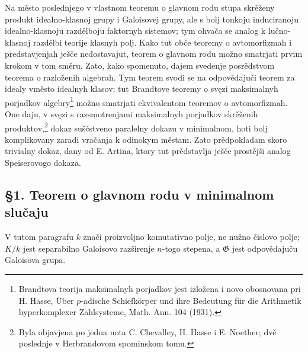 \documentclass[11pt]{article}
\newcommand{\foreign}[1]{#1}
\providecommand{\Gg}{\mathfrak G}
\begin{document}
Na město poslednjego v vlastnom teoremu o glavnom rodu stupa skrěženy produkt idealno-klasnoj grupy i Galoisovej grupy, ale s bolj tonkoju induciranoju idealno-klasnoju razdělboju faktornyh sistemov; tym ohvača se analog k lučno-klasnoj razdělbi teorije klasnyh polj. Kako tut obče teoremy o avtomorfizmah i predstavjenjah ješče nedostavajut, teorem o glavnom rodu možno smatrjati prvim krokom v tom směru. Zato, kako spomenuto, dajem svedenje posrědstvom teorema o razloženih algebrah. Tym teorem svodi se na odpovědajuči teorem za idealy vměsto idealnyh klasov; tut Brandtove teoremy o svęzi maksimalnyh porjadkov algebry\footnote{Brandtova teorija maksimalnyh porjadkov jest izložena i novo obosnovana pri H. Hasse, \foreign{Über \(p\)-adische Schiefkörper und ihre Bedeutung für die Arithmetik hyperkomplexer Zahlsysteme}, Math. Ann. 104 (1931).} možno smatrjati ekvivalentom teoremov o avtomorfizmah. One daju, v svęzi s razsmotrenjami maksimalnyh porjadkov skrěženih produktov,\footnote{Byla objavjena po jedna nota C. Chevalley, H. Hasse i E. Noether; dvě poslednje v Herbrandovom spominskom tomu.} dokaz suščstveno paralelny dokazu v minimalnom, hoti bolj komplikovany zaradi vračanja k odinokym městam. Zato prědpokladam skoro trivialny dokaz, dany od E. Artina, ktory tut prědstavlja ješče prostějši analog Speiserovogo dokaza.

\subsection*{§1. Teorem o glavnom rodu v minimalnom slučaju}

V tutom paragrafu \(k\) znači proizvoljno komutativno polje, ne nužno čislovo polje; \(K/k\) jest separabilno Galoisovo razširenje \(n\)-togo stepena, a \(\Gg\) jest odpovědajuču Galoisova grupa.
\end{document}
